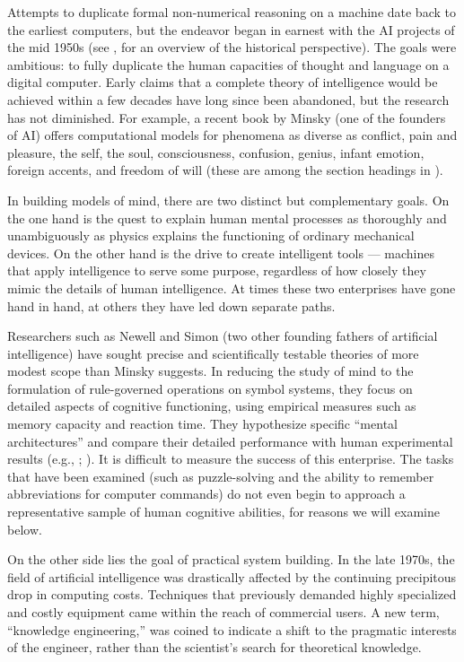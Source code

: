 \documentclass[12pt]{article}
\begin{document}
Attempts to duplicate formal non-numerical reasoning on a machine date back to the earliest computers, but the endeavor began in earnest with the AI projects of the mid 1950s (see \cite{gardner1985}, for an overview of the historical perspective). The goals were ambitious: to fully duplicate the human capacities of thought and language on a digital computer. Early claims that a complete theory of intelligence would be achieved within a few decades have long since been abandoned, but the research has not diminished. For example, a recent book by Minsky (one of the founders of AI) offers computational models for phenomena as diverse as conflict, pain and pleasure, the self, the soul, consciousness, confusion, genius, infant emotion, foreign accents, and freedom of will (these are among the section headings in \parencite{minsky1986}).

In building models of mind, there are two distinct but complementary goals. On the one hand is the quest to explain human mental processes as thoroughly and unambiguously as physics explains the functioning of ordinary mechanical devices. On the other hand is the drive to create intelligent tools --- machines that apply intelligence to serve some purpose, regardless of how closely they mimic the details of human intelligence. At times these two enterprises have gone hand in hand, at others they have led down separate paths.

Researchers such as Newell and Simon (two other founding fathers of artificial intelligence) have sought precise and scientifically testable theories of more modest scope than Minsky suggests. In reducing the study of mind to the formulation of rule-governed operations on symbol systems, they focus on detailed aspects of cognitive functioning, using empirical measures such as memory capacity and reaction time. They hypothesize specific ``mental architectures'' and compare their detailed performance with human experimental results (e.g., \cite{newell1972}; \cite{laird1986}). It is difficult to measure the success of this enterprise. The tasks that have been examined (such as puzzle-solving and the ability to remember abbreviations for computer commands) do not even begin to approach a representative sample of human cognitive abilities, for reasons we will examine below.

On the other side lies the goal of practical system building. In the late 1970s, the field of artificial intelligence was drastically affected by the continuing precipitous drop in computing costs. Techniques that previously demanded highly specialized and costly equipment came within the reach of commercial users. A new term, ``knowledge engineering,'' was coined to indicate a shift to the pragmatic interests of the engineer, rather than the scientist's search for theoretical knowledge.
\end{document}
